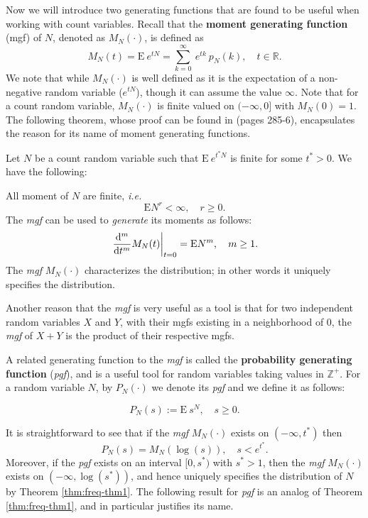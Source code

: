 \documentclass[]{book}
\theoremstyle{definition}
\theoremstyle{definition}
\theoremstyle{definition}
\theoremstyle{remark}
\let\BeginKnitrBlock\begin \let\EndKnitrBlock\end
\begin{document}
Now we will introduce two generating functions that are found to be
useful when working with count variables. Recall that the \textbf{moment
generating function} (mgf) of \(N\), denoted as \(M_N(\cdot)\), is
defined as \[
M_N(t) = \mathrm{E}~{e^{tN}} = \sum^{\infty}_{k=0} ~e^{tk}~ p_N(k), \quad t\in \mathbb{R}.
\] We note that while \(M_N(\cdot)\) is well defined as it is the
expectation of a non-negative random variable (\(e^{tN}\)), though it
can assume the value \(\infty\). Note that for a count random variable,
\(M_N(\cdot)\) is finite valued on \((-\infty,0]\) with \(M_N(0)=1\).
The following theorem, whose proof can be found in \citep{billingsley}
(pages 285-6), encapsulates the reason for its name of moment generating
functions.

\BeginKnitrBlock{theorem}
\protect\hypertarget{thm:freq-thm1}{}{\label{thm:freq-thm1} }Let \(N\) be a
count random variable such that \(\mathrm{E}~{e^{t^\ast N}}\) is finite
for some \(t^\ast>0\). We have the following:

All moment of \(N\) are finite, \emph{i.e.} \[
\mathrm{E}{N^r}<\infty, \quad r\geq 0.
\] The \emph{mgf} can be used to \emph{generate} its moments as follows:
\[
\left.\frac{{\rm d}^m}{{\rm d}t^m} M_N(t)\right\vert_{t=0}=\mathrm{E}{N^m}, \quad m\geq 1.
\] The \emph{mgf} \(M_N(\cdot)\) characterizes the distribution; in
other words it uniquely specifies the distribution.
\EndKnitrBlock{theorem}

Another reason that the \emph{mgf} is very useful as a tool is that for
two independent random variables \(X\) and \(Y\), with their mgfs
existing in a neighborhood of \(0\), the \emph{mgf} of \(X+Y\) is the
product of their respective mgfs.

A related generating function to the \emph{mgf} is called the
\textbf{probability generating function} (\emph{pgf}), and is a useful
tool for random variables taking values in \(\mathbb{Z}^+\). For a
random variable \(N\), by \(P_N(\cdot)\) we denote its \emph{pgf} and we
define it as follows:

\begin{equation}
P_N(s):=\mathrm{E}~{s^N}, \quad s\geq 0.
\end{equation}

It is straightforward to see that if the \emph{mgf} \(M_N(\cdot)\)
exists on \((-\infty,t^\ast)\) then \[
P_N(s)=M_N(\log(s)), \quad s<e^{t^\ast}.
\] Moreover, if the \emph{pgf} exists on an interval \([0,s^\ast)\) with
\(s^\ast>1\), then the \emph{mgf} \(M_N(\cdot)\) exists on
\((-\infty,\log(s^\ast))\), and hence uniquely specifies the
distribution of \(N\) by Theorem \ref{thm:freq-thm1}. The following
result for \emph{pgf} is an analog of Theorem \ref{thm:freq-thm1}, and
in particular justifies its name.
\end{document}
